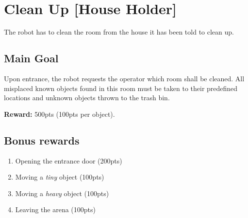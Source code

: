 \section{Clean Up [House Holder]}
The robot has to clean the room from the house it has been told to clean up.


\subsection{Main Goal}
Upon entrance, the robot requests the operator which room shall be cleaned.
All misplaced known objects found in this room must be taken to their predefined locations and unknown objects thrown to the trash bin.

\noindent\textbf{Reward:} 500pts (100pts per object).

\subsection{Bonus rewards}
\begin{enumerate}[nosep]
	\item Opening the entrance door (200pts)
	\item Moving a \emph{tiny} object (100pts)
	\item Moving a \emph{heavy} object (100pts)
	\item Leaving the arena (100pts)
\end{enumerate}


